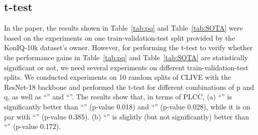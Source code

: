 \documentclass[sigconf]{acmart}
\begin{document}
\subsection{t-test}
In the paper, the results shown in Table~\ref{tab:pq} and Table~\ref{tab:SOTA} were based on the experiments on one train-validation-test split provided by the KonIQ-10k dataset's owner. However, for performing the t-test to verify whether the performance gains in Table~\ref{tab:pq} and Table~\ref{tab:SOTA} are statistically significant or not, we need several experiments on different train-validation-test splits.
We conducted experiments on 10 random splits of CLIVE with the ResNet-18 backbone and performed the t-test for different combinations of p and q, as well as ``'' and ``''. 
The results show that, in terms of PLCC, 
(a) ``'' is significantly better than ``'' (p-value 0.018) and ``'' (p-value 0.028), while it is on par with ``'' (p-value 0.385). 
(b) ``'' is slightly (but not significantly) better than ``'' (p-value 0.172).
\end{document}
